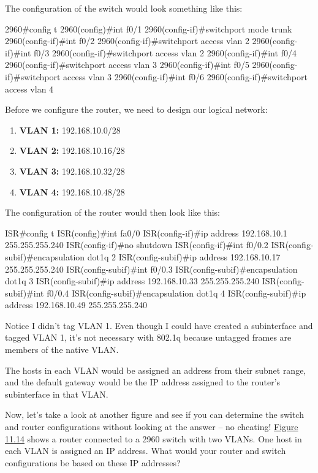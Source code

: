 The configuration of the switch would look something like this:

\begin{cli}
2960#config t
2960(config)#int f0/1
2960(config-if)#switchport mode trunk
2960(config-if)#int f0/2
2960(config-if)#switchport access vlan 2
2960(config-if)#int f0/3
2960(config-if)#switchport access vlan 2
2960(config-if)#int f0/4
2960(config-if)#switchport access vlan 3
2960(config-if)#int f0/5
2960(config-if)#switchport access vlan 3
2960(config-if)#int f0/6
2960(config-if)#switchport access vlan 4
\end{cli}

Before we configure the router, we need to design our logical network:

\begin{enumerate}
\item
  \textbf{VLAN 1:} 192.168.10.0/28
\item
  \textbf{VLAN 2:} 192.168.10.16/28
\item
  \textbf{VLAN 3:} 192.168.10.32/28
\item
  \textbf{VLAN 4:} 192.168.10.48/28
\end{enumerate}

The configuration of the router would then look like this:

\begin{cli}
ISR#config t
ISR(config)#int fa0/0
ISR(config-if)#ip address 192.168.10.1 255.255.255.240
ISR(config-if)#no shutdown
ISR(config-if)#int f0/0.2
ISR(config-subif)#encapsulation dot1q 2
ISR(config-subif)#ip address 192.168.10.17 255.255.255.240
ISR(config-subif)#int f0/0.3
ISR(config-subif)#encapsulation dot1q 3
ISR(config-subif)#ip address 192.168.10.33 255.255.255.240
ISR(config-subif)#int f0/0.4
ISR(config-subif)#encapsulation dot1q 4
ISR(config-subif)#ip address 192.168.10.49 255.255.255.240
\end{cli}

Notice I didn't tag VLAN 1. Even though I could have created a
subinterface and tagged VLAN 1, it's not necessary with 802.1q because
untagged frames are members of the native VLAN.

The hosts in each VLAN would be assigned an address from their subnet
range, and the default gateway would be the IP address assigned to the
router's subinterface in that VLAN.

Now, let's take a look at another figure and see if you can determine
the switch and router configurations without looking at the answer -- no
cheating! \protect\hyperlink{c11.xhtmlux5cux23figure11-14}{Figure 11.14}
shows a router connected to a 2960 switch with two VLANs. One host in
each VLAN is assigned
an IP address. What
would your router and switch configurations be based on these IP
addresses?

